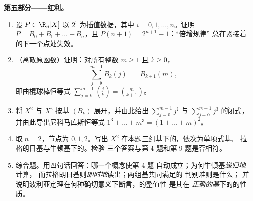 \begin{problem}
\medskip
\noindent\textbf{第五部分——红利。}
\begin{enumerate}[resume]
  \item 设 $P \in \R_n[X]$ 以 $2^i$ 为插值数据，其中 $i =
        0, 1, \dots, n$。证明 $P = B_0 + B_1 + \dots + B_n$，且
        $P(n + 1) = 2^{n+1} - 1$：“倍增规律”
        总在紧接着的下一个点处失效。
  \item （离散原函数）证明：对所有整数 $m
        \geq 1$ 且 $k \geq 0$，
        \[
        \sum_{j=0}^{m-1} B_k(j) \;=\; B_{k+1}(m),
        \]
        即曲棍球棒恒等式 $\sum_{j=k}^{m-1}
        \binom{j}{k} = \binom{m}{k+1}$。
  \item 将 $X^2$ 与 $X^3$ 按基 $(B_k)$ 展开，并由此给出
        $\sum_{j=0}^{m-1} j^2$ 与
        $\sum_{j=0}^{m-1} j^3$ 的闭式，并由此导出尼科马库斯恒等式
        $1^3 + \dots + m^3 = (1 + \dots + m)^2$。
  \item 取 $n = 2$，节点为 $0, 1, 2$。写出
        $X^2$ 在本题三组基下的，依次为单项式基、
        拉格朗日基与牛顿基下的。检验
        三个答案与第 4 题和第 9 题是否相符。
  \item 综合题。用四句话回答：哪一个概念使第 4 题
        自动成立；为何牛顿基\emph{递归地}计算，
        而拉格朗日基则\emph{即时地}读出；两组基共同满足的
        判别准则是什么；
        并说明波利亚定理在何种确切意义下断言，的整值性
        是其在
        \emph{正确的基}下的的性质。
\end{enumerate}
\end{problem}
